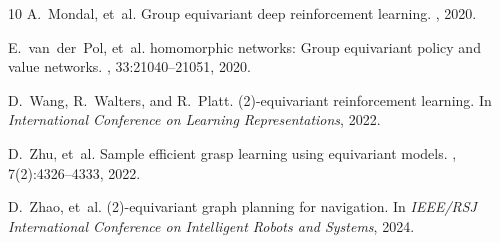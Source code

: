 \documentclass{article}
\begin{document}
\begin{thebibliography}{10}
A.~Mondal, et~al.
\newblock Group equivariant deep reinforcement learning.
, 2020.

E.~van~der~Pol, et~al.
 homomorphic networks: Group equivariant policy and value networks.
, 33:21040--21051, 2020.

D.~Wang, R.~Walters, and R.~Platt.
(2)-equivariant reinforcement learning.
\newblock In {\em International Conference on Learning Representations}, 2022.

D.~Zhu, et~al.
\newblock Sample efficient grasp learning using equivariant models.
, 7(2):4326--4333, 2022.

D.~Zhao, et~al.
(2)-equivariant graph planning for navigation.
\newblock In {\em IEEE/RSJ International Conference on Intelligent Robots and Systems}, 2024.

\end{thebibliography}
\end{document}
